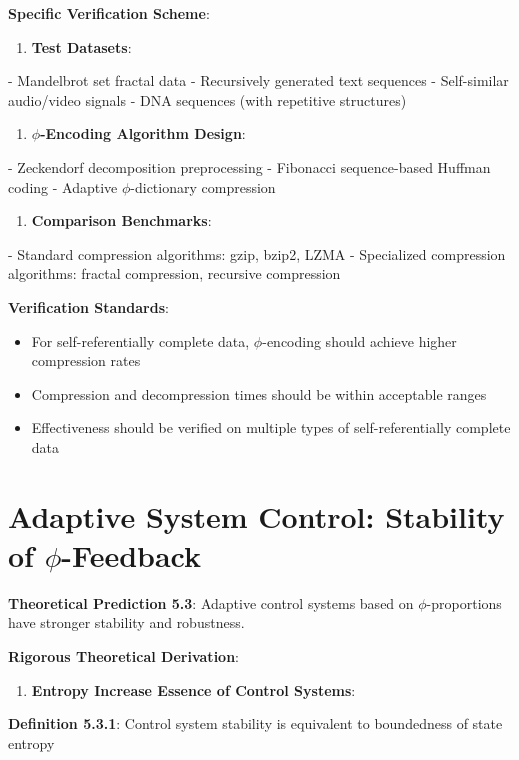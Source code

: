 \textbf{Specific Verification Scheme}:
\begin{enumerate}
\item \textbf{Test Datasets}:
\end{enumerate}
   - Mandelbrot set fractal data
   - Recursively generated text sequences
   - Self-similar audio/video signals
   - DNA sequences (with repetitive structures)

\begin{enumerate}
\item \textbf{$\phi$-Encoding Algorithm Design}:
\end{enumerate}
   - Zeckendorf decomposition preprocessing
   - Fibonacci sequence-based Huffman coding
   - Adaptive $\phi$-dictionary compression

\begin{enumerate}
\item \textbf{Comparison Benchmarks}:
\end{enumerate}
   - Standard compression algorithms: gzip, bzip2, LZMA
   - Specialized compression algorithms: fractal compression, recursive compression

\textbf{Verification Standards}:
\begin{itemize}
\item For self-referentially complete data, $\phi$-encoding should achieve higher compression rates
\item Compression and decompression times should be within acceptable ranges
\item Effectiveness should be verified on multiple types of self-referentially complete data
\end{itemize}

\section{Adaptive System Control: Stability of $\phi$-Feedback}
\label{sec:ch05_applications:adaptive-system-control-stability-of-phi-feedback}

\textbf{Theoretical Prediction 5.3}: Adaptive control systems based on $\phi$-proportions have stronger stability and robustness.

\textbf{Rigorous Theoretical Derivation}:

\begin{enumerate}
\item \textbf{Entropy Increase Essence of Control Systems}:
\end{enumerate}
   \textbf{Definition 5.3.1}: Control system stability is equivalent to boundedness of state entropy
\label{def:5.3.1}
   
